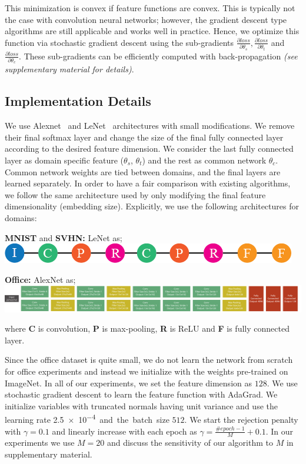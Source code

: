 This minimization is convex if feature functions are convex. This is typically not the case with convolution neural networks; however, the gradient descent type algorithms are still applicable and works well in practice. Hence, we optimize this function via stochastic gradient descent using the sub-gradients $\frac{\partial loss}{\partial \theta_s}, \frac{\partial loss}{\partial \theta_t}$ and $\frac{\partial loss}{\partial \theta_c}$. These sub-gradients can be efficiently computed with back-propagation \emph{(see supplementary material for details)}.

\subsection{Implementation Details}
\label{imp_det}
We use Alexnet~\cite{alexnet} and LeNet~\cite{lenet} architectures with small modifications. We remove their final softmax layer and change the size of the final fully connected layer according to the desired feature dimension. We consider the last fully connected layer as domain specific feature ($\theta_s$, $\theta_t$) and the rest as common network $\theta_c$. Common network weights are tied between domains, and the final layers are learned separately. In order to have a fair comparison with existing algorithms, we follow the same architecture used by \cite{ganin15} only modifying the final feature dimensionality (embedding size). Explicitly, we use the following architectures for domains:

\noindent \textbf{MNIST} and \textbf{SVHN:} LeNet\cite{lenet} as; \includegraphics[width=0.40\columnwidth]{lenet}

\noindent \textbf{Office:} AlexNet\cite{alexnet} as; \includegraphics[width=0.73\columnwidth]{alexnet}

where \textbf{C} is convolution, \textbf{P} is max-pooling, \textbf{R} is ReLU and \textbf{F} is fully connected layer. 

Since the office dataset is quite small, we do not learn the network from scratch for office experiments and instead we initialize with the weights pre-trained on ImageNet. In all of our experiments, we set the feature dimension as $128$. We use stochastic gradient descent to learn the feature function with AdaGrad\cite{adagrad}. We initialize variables with truncated normals having unit variance and use the learning rate \SI{2.5e-4}  and the batch size $512$. We start the rejection penalty with $\gamma=0.1$ and linearly increase with each epoch as $\gamma=\frac{\#epoch -1}{M}+0.1$. In our experiments we use $M=20$ and discuss the sensitivity of our algorithm to $M$ in supplementary material.

  